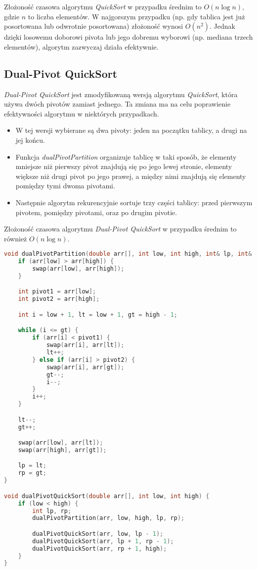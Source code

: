 \documentclass[a4paper,12pt]{article}
\begin{document}
Złożoność czasowa algorytmu \textit{QuickSort} w przypadku średnim to \(O(n \log n)\), gdzie \(n\) to liczba elementów. W najgorszym przypadku (np. gdy tablica jest już posortowana lub odwrotnie posortowana) złożoność wynosi \(O(n^2)\). Jednak dzięki losowemu doborowi pivota lub jego dobremu wyborowi (np. mediana trzech elementów), algorytm zazwyczaj działa efektywnie.

\subsection{Dual-Pivot QuickSort}
\textit{Dual-Pivot QuickSort} jest zmodyfikowaną wersją algorytmu \textit{QuickSort}, która używa dwóch pivotów zamiast jednego. Ta zmiana ma na celu poprawienie efektywności algorytmu w niektórych przypadkach.

\begin{itemize}
    \item W tej wersji wybierane są dwa pivoty: jeden na początku tablicy, a drugi na jej końcu.
    \item Funkcja \textit{dualPivotPartition} organizuje tablicę w taki sposób, że elementy mniejsze niż pierwszy pivot znajdują się po jego lewej stronie, elementy większe niż drugi pivot po jego prawej, a między nimi znajdują się elementy pomiędzy tymi dwoma pivotami.
    \item Następnie algorytm rekurencyjnie sortuje trzy części tablicy: przed pierwszym pivotem, pomiędzy pivotami, oraz po drugim pivotie.
\end{itemize}

Złożoność czasowa algorytmu \textit{Dual-Pivot QuickSort} w przypadku średnim to również \(O(n \log n)\).

\begin{lstlisting}[language=C++,caption=Quick Sort z 2 pivotami/ dzieleniem na 3 części]
void dualPivotPartition(double arr[], int low, int high, int& lp, int& rp) {
    if (arr[low] > arr[high]) {
        swap(arr[low], arr[high]);
    }

    int pivot1 = arr[low];
    int pivot2 = arr[high];

    int i = low + 1, lt = low + 1, gt = high - 1;

    while (i <= gt) {
        if (arr[i] < pivot1) {
            swap(arr[i], arr[lt]);
            lt++;
        } else if (arr[i] > pivot2) {
            swap(arr[i], arr[gt]);
            gt--;
            i--;
        }
        i++;
    }

    lt--;
    gt++;

    swap(arr[low], arr[lt]);
    swap(arr[high], arr[gt]);

    lp = lt;
    rp = gt;
}

void dualPivotQuickSort(double arr[], int low, int high) {
    if (low < high) {
        int lp, rp;
        dualPivotPartition(arr, low, high, lp, rp);

        dualPivotQuickSort(arr, low, lp - 1);
        dualPivotQuickSort(arr, lp + 1, rp - 1);
        dualPivotQuickSort(arr, rp + 1, high);
    }
}
\end{lstlisting}
\newpage
\end{document}
